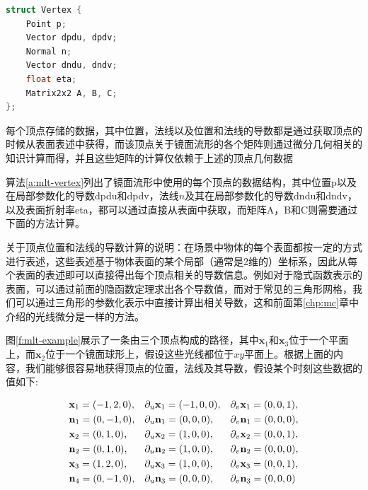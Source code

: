 \begin{algorithm}
\begin{lstlisting}[language=C++, mathescape]
struct Vertex { 
	Point p;
	Vector dpdu, dpdv; 
	Normal n;
	Vector dndu, dndv; 
	float eta; 
	Matrix2x2 A, B, C;
};
\end{lstlisting}
\caption{每个顶点存储的数据，其中位置，法线以及位置和法线的导数都是通过获取顶点的时候从表面表述中获得，而该顶点关于镜面流形的各个矩阵则通过微分几何相关的知识计算而得，并且这些矩阵的计算仅依赖于上述的顶点几何数据}
\label{a:mlt-vertex}
\end{algorithm}

算法\ref{a:mlt-vertex}列出了镜面流形中使用的每个顶点的数据结构，其中位置p以及在局部参数化的导数dpdu和dpdv，法线$n$及其在局部参数化的导数dndu和dndv，以及表面折射率eta，都可以通过直接从表面中获取，而矩阵A，B和C则需要通过下面的方法计算。

\begin{myshaded}
	关于顶点位置和法线的导数计算的说明：在场景中物体的每个表面都按一定的方式进行表述，这些表述基于物体表面的某个局部（通常是2维的）坐标系，因此从每个表面的表述即可以直接得出每个顶点相关的导数信息。例如对于隐式函数表示的表面，可以通过前面的隐函数定理求出各个导数值，而对于常见的三角形网格，我们可以通过三角形的参数化表示中直接计算出相关导数，这和前面第\ref{chp:mc}章中介绍的光线微分是一样的方法。
\end{myshaded}

图\ref{f:mlt-example}展示了一条由三个顶点构成的路径，其中$\mathbf{x}_1$和$\mathbf{x}_3$位于一个平面上，而$\mathbf{x}_2$位于一个镜面球形上，假设这些光线都位于$xy$平面上。根据上面的内容，我们能够很容易地获得顶点的位置，法线及其导数，假设某个时刻这些数据的值如下:

\begin{equation}
\begin{aligned}
	&\mathbf{x}_1=(-1,2,0), &&{\rm \partial}_u\mathbf{x}_1=(-1,0,0), &&{\rm \partial}_v\mathbf{x}_1=(0,0,1),\\
	&\mathbf{n}_1=(0,-1,0), &&{\rm \partial}_u\mathbf{n}_1=(0,0,0),  &&{\rm \partial}_v\mathbf{n}_1=(0,0,0),\\
	&\mathbf{x}_2=(0,1,0),  &&{\rm \partial}_u\mathbf{x}_2=(1,0,0),  &&{\rm \partial}_v\mathbf{x}_2=(0,0,1),\\
	&\mathbf{n}_2=(0,1,0),  &&{\rm \partial}_u\mathbf{n}_2=(1,0,0),  &&{\rm \partial}_v\mathbf{n}_2=(0,0,0),\\
	&\mathbf{x}_3=(1,2,0),  &&{\rm \partial}_u\mathbf{x}_3=(1,0,0),  &&{\rm \partial}_v\mathbf{x}_3=(0,0,1),\\
	&\mathbf{n}_4=(0,-1,0), &&{\rm \partial}_u\mathbf{n}_3=(0,0,0),  &&{\rm \partial}_v\mathbf{n}_3=(0,0,0)
\end{aligned}
\end{equation}

